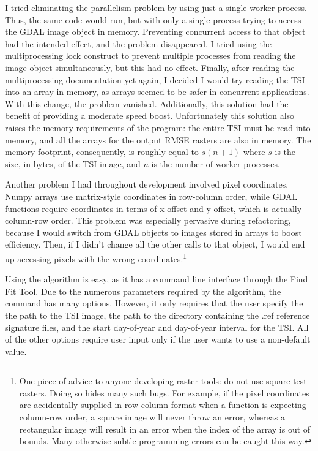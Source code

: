 I tried eliminating the parallelism problem by using just a single worker process. Thus, the same code would run, but with only a single process trying to access the GDAL image object in memory. Preventing concurrent access to that object had the intended effect, and the problem disappeared. I tried using the multiprocessing lock construct to prevent multiple processes from reading the image object simultaneously, but this had no effect. Finally, after reading the multiprocessing documentation yet again, I decided I would try reading the TSI into an array in memory, as arrays seemed to be safer in concurrent applications. With this change, the problem vanished. Additionally, this solution had the benefit of providing a moderate speed boost. Unfortunately this solution also raises the memory requirements of the program: the entire TSI must be read into memory, and all the arrays for the output RMSE rasters are also in memory. The memory footprint, consequently, is roughly equal to $s(n + 1)$ where $s$ is the size, in bytes, of the TSI image, and $n$ is the number of worker processes.

Another problem I had throughout development involved pixel coordinates. Numpy arrays use matrix-style coordinates in row-column order, while GDAL functions require coordinates in terms of x-offset and y-offset, which is actually column-row order. This problem was especially pervasive during refactoring, because I would switch from GDAL objects to images stored in arrays to boost efficiency. Then, if I didn't change all the other calls to that object, I would end up accessing pixels with the wrong coordinates.\footnote{One piece of advice to anyone developing raster tools: do not use square test rasters. Doing so hides many such bugs. For example, if the pixel coordinates are accidentally supplied in row-column format when a function is expecting column-row order, a square image will never throw an error, whereas a rectangular image will result in an error when the index of the array is out of bounds. Many otherwise subtle programming errors can be caught this way.}

Using the algorithm is easy, as it has a command line interface through the Find Fit Tool. Due to the numerous parameters required by the algorithm, the command has many options. However, it only requires that the user specify the the path to the TSI image, the path to the directory containing the .ref reference signature files, and the start day-of-year and day-of-year interval for the TSI. All of the other options require user input only if the user wants to use a non-default value.



